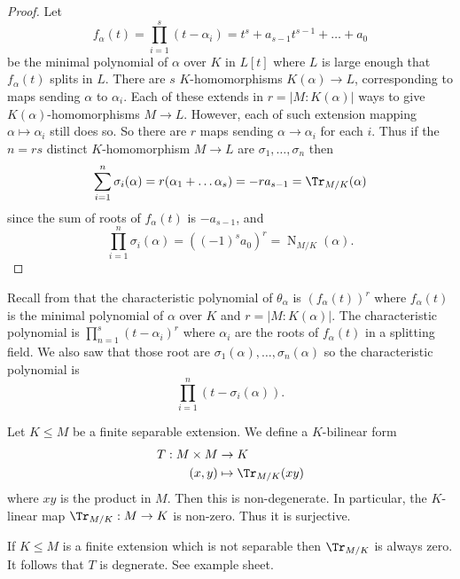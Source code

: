 \documentclass[a4paper]{article}
\DeclareMathOperator{\n}{N}
\begin{document}
\begin{proof}
  Let
  \[
    f_\alpha(t) = \prod_{i = 1}^{s} (t - \alpha_i) = t^s + a_{s - 1}t^{s - 1} + \dots + a_0
  \]
  be the minimal polynomial of \(\alpha\) over \(K\) in \(L[t]\) where \(L\) is large enough that \(f_\alpha(t)\) splits in \(L\). There are \(s\) \(K\)-homomorphisms \(K(\alpha) \to L\), corresponding to maps sending \(\alpha\) to \(\alpha_i\). Each of these extends in \(r = |M:K(\alpha)|\) ways to give \(K(\alpha)\)-homomorphisms \(M \to L\). However, each of such extension mapping \(\alpha \mapsto \alpha_i\) still does so. So there are \(r\) maps sending \(\alpha \to \alpha_i\) for each \(i\). Thus if the \(n = rs\) distinct \(K\)-homomorphism \(M \to L\) are \(\sigma_1, \dots, \sigma_n\) then
  \[
    \sum_{i = 1}^{n} \sigma_i(\alpha) = r(\alpha_1 + \dots \alpha_s) = -ra_{s - 1} = \Tr_{M/K} (\alpha)
  \]
  since the sum of roots of \(f_\alpha(t)\) is \(-a_{s - 1}\), and
  \[
    \prod_{i = 1}^{n} \sigma_i(\alpha) = ((-1)^s a_0)^r = \n_{M/K}(\alpha).
  \]
\end{proof}

%
%
%
%
%
Recall from  that the characteristic polynomial of \(\theta_\alpha\) is \((f_\alpha(t))^r\) where \(f_\alpha(t)\) is the minimal polynomial of \(\alpha\) over \(K\) and \(r = |M:K(\alpha)|\). The characteristic polynomial is \(\prod_{n = 1}^{s} (t - \alpha_i)^r\) where \(\alpha_i\) are the roots of \(f_\alpha(t)\) in a splitting field. We also saw that those root are \(\sigma_1(\alpha), \dots, \sigma_n(\alpha)\) so the characteristic polynomial is
\[
  \prod_{i = 1}^{n} (t - \sigma_i(\alpha)).
\]

\begin{theorem}
  \label{thm:vandermonde}
  Let \(K \leq M\) be a finite separable extension. We define a \(K\)-bilinear form
  \begin{align*}
    T: M \times M &\to K \\
    (x, y) &\mapsto \Tr_{M/K}(xy)
  \end{align*}
  where \(xy\) is the product in \(M\). Then this is non-degenerate. In particular, the \(K\)-linear map \(\Tr_{M/K}: M \to K\) is non-zero. Thus it is surjective.
\end{theorem}

\begin{remark}
  If \(K \leq M\) is a finite extension which is not separable then \(\Tr_{M/K}\) is always zero. It follows that \(T\) is degnerate. See example sheet.
\end{remark}
\end{document}

